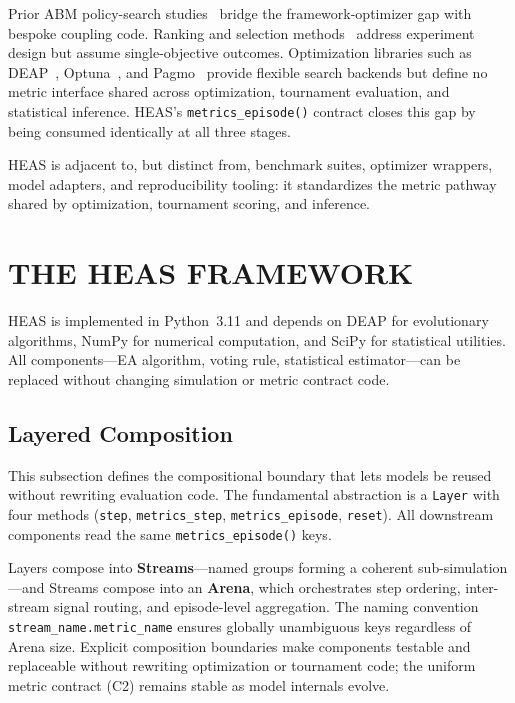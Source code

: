 \documentclass{wscpaperproc}
\begin{document}
Prior ABM policy-search studies~\cite{tesfatsion2006ace,pangallo2019best,zheng2022aieconomist}
bridge the framework-optimizer gap with bespoke coupling code.
Ranking and selection methods~\cite{goldsman1994ranking} address experiment design
but assume single-objective outcomes.
Optimization libraries such as DEAP~\cite{fortin2012deap},
Optuna~\cite{akiba2019optuna}, and Pagmo~\cite{biscani2020pagmo} provide
flexible search backends but define no metric interface shared across
optimization, tournament evaluation, and statistical inference. HEAS's
\texttt{metrics\_episode()} contract closes this gap by being consumed
identically at all three stages.

HEAS is adjacent to, but distinct from, benchmark suites, optimizer wrappers,
model adapters, and reproducibility tooling: it standardizes the metric pathway
shared by optimization, tournament scoring, and inference.

\section{THE HEAS FRAMEWORK}

HEAS is implemented in Python~3.11 and depends on DEAP for evolutionary
algorithms, NumPy for numerical computation, and SciPy for statistical
utilities. All components---EA algorithm, voting rule, statistical
estimator---can be replaced without changing simulation or metric contract code.

\subsection{Layered Composition}

This subsection defines the compositional boundary that lets models be reused
without rewriting evaluation code. The fundamental abstraction is a
\texttt{Layer} with four methods
(\texttt{step}, \texttt{metrics\_step}, \texttt{metrics\_episode},
\texttt{reset}). All downstream components read the same
\texttt{metrics\_episode()} keys.

Layers compose into \textbf{Streams}---named groups forming a coherent
sub-simulation---and Streams compose into an \textbf{Arena}, which orchestrates
step ordering, inter-stream signal routing, and episode-level aggregation. The
naming convention \texttt{stream\_name.metric\_name} ensures globally unambiguous
keys regardless of Arena size. Explicit composition boundaries make components
testable and replaceable without rewriting optimization or tournament code;
the uniform metric contract (C2) remains stable as model internals evolve.
\end{document}
